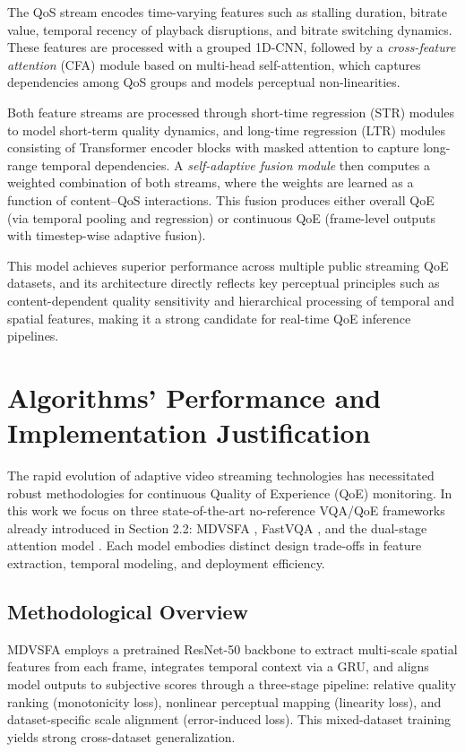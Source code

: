 The QoS stream encodes time-varying features such as stalling duration, bitrate value, temporal recency of playback disruptions, and bitrate switching dynamics. These features are processed with a grouped 1D-CNN, followed by a \textit{cross-feature attention} (CFA) module based on multi-head self-attention, which captures dependencies among QoS groups and models perceptual non-linearities.

Both feature streams are processed through short-time regression (STR) modules to model short-term quality dynamics, and long-time regression (LTR) modules consisting of Transformer encoder blocks with masked attention to capture long-range temporal dependencies. A \textit{self-adaptive fusion module} then computes a weighted combination of both streams, where the weights are learned as a function of content–QoS interactions. This fusion produces either overall QoE (via temporal pooling and regression) or continuous QoE (frame-level outputs with timestep-wise adaptive fusion).

This model achieves superior performance across multiple public streaming QoE datasets, and its architecture directly reflects key perceptual principles such as content-dependent quality sensitivity and hierarchical processing of temporal and spatial features, making it a strong candidate for real-time QoE inference pipelines.

\section{Algorithms' Performance and Implementation Justification}  
\label{sec:performance_conclusions}

The rapid evolution of adaptive video streaming technologies has necessitated robust methodologies for continuous Quality of Experience (QoE) monitoring. In this work we focus on three state-of-the-art no-reference VQA/QoE frameworks already introduced in Section 2.2: MDVSFA \cite{li2023unified}, FastVQA \cite{wu2022fastvqa}, and the dual-stage attention model \cite{jia2024continuous}. Each model embodies distinct design trade-offs in feature extraction, temporal modeling, and deployment efficiency.

\subsection{Methodological Overview}  
MDVSFA \cite{li2023unified} employs a pretrained ResNet-50 backbone to extract multi-scale spatial features from each frame, integrates temporal context via a GRU, and aligns model outputs to subjective scores through a three-stage pipeline: relative quality ranking (monotonicity loss), nonlinear perceptual mapping (linearity loss), and dataset-specific scale alignment (error-induced loss). This mixed-dataset training yields strong cross-dataset generalization.  

